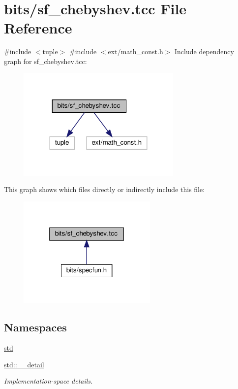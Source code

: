 \hypertarget{sf__chebyshev_8tcc}{}\section{bits/sf\+\_\+chebyshev.tcc File Reference}
\label{sf__chebyshev_8tcc}
{\ttfamily \#include $<$tuple$>$}\newline
{\ttfamily \#include $<$ext/math\+\_\+const.\+h$>$}\newline
Include dependency graph for sf\+\_\+chebyshev.\+tcc\+:
\nopagebreak
\begin{figure}[H]
\begin{center}
\leavevmode
\includegraphics[width=228pt]{sf__chebyshev_8tcc__incl}
\end{center}
\end{figure}
This graph shows which files directly or indirectly include this file\+:
\nopagebreak
\begin{figure}[H]
\begin{center}
\leavevmode
\includegraphics[width=193pt]{sf__chebyshev_8tcc__dep__incl}
\end{center}
\end{figure}
\subsection*{Namespaces}
\begin{DoxyCompactItemize}
\item 
 \hyperlink{namespacestd}{std}
\item 
 \hyperlink{namespacestd_1_1____detail}{std\+::\+\_\+\+\_\+detail}
\begin{DoxyCompactList}\small\item\em Implementation-\/space details. \end{DoxyCompactList}\end{DoxyCompactItemize}
